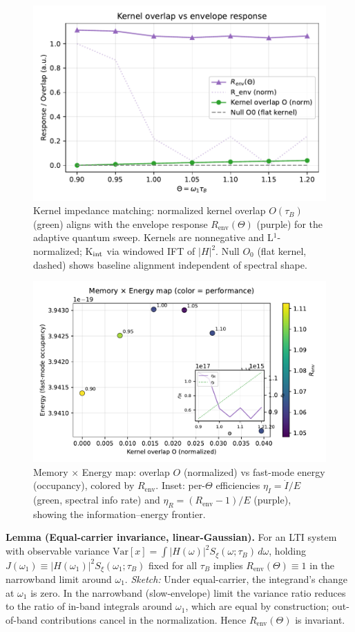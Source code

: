 \documentclass[11pt,letterpaper]{article}
\begin{document}
\begin{figure}[t]
\centering
\includegraphics[width=0.8\linewidth]{figH_kernel_overlap.pdf}
\caption{Kernel impedance matching: normalized kernel overlap $O(\tau_B)$ (green) aligns with the envelope response $R_{\mathrm{env}}(\Theta)$ (purple) for the adaptive quantum sweep. Kernels are nonnegative and L$^1$-normalized; K$_{\rm int}$ via windowed IFT of $|H|^2$. Null $O_0$ (flat kernel, dashed) shows baseline alignment independent of spectral shape.}
\end{figure}

\begin{figure}[t]
\centering
\includegraphics[width=0.8\linewidth]{figI_memory_energy.pdf}
\caption{Memory $\times$ Energy map: overlap $O$ (normalized) vs fast-mode energy (occupancy), colored by $R_{\mathrm{env}}$. Inset: per-$\Theta$ efficiencies $\eta_I=\dot I/E$ (green, spectral info rate) and $\eta_R=(R_{\mathrm{env}}-1)/E$ (purple), showing the information--energy frontier.}
\end{figure}

\begin{tcolorbox}
\textbf{Lemma (Equal-carrier invariance, linear-Gaussian).} For an LTI system with observable variance $\mathrm{Var}[x]=\int |H(\omega)|^2 S_\xi(\omega;\tau_B)\,d\omega$, holding $J(\omega_1)\equiv |H(\omega_1)|^2 S_\xi(\omega_1;\tau_B)$ fixed for all $\tau_B$ implies $R_{\mathrm{env}}(\Theta)\equiv 1$ in the narrowband limit around $\omega_1$. \emph{Sketch:} Under equal-carrier, the integrand's change at $\omega_1$ is zero. In the narrowband (slow-envelope) limit the variance ratio reduces to the ratio of in-band integrals around $\omega_1$, which are equal by construction; out-of-band contributions cancel in the normalization. Hence $R_{\mathrm{env}}(\Theta)$ is invariant.
\end{tcolorbox}
\end{document}
